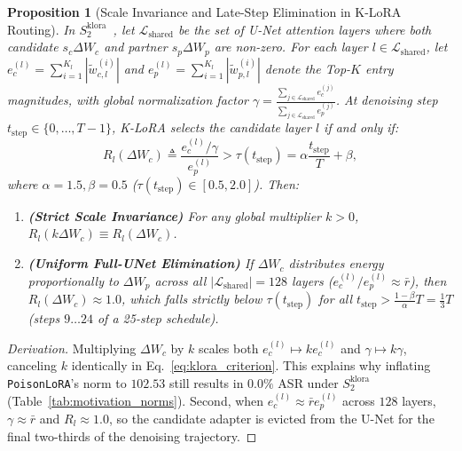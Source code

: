 \documentclass[10pt,twocolumn,letterpaper]{article}
\newtheorem{proposition}{Proposition}
\begin{document}
\begin{proposition}[Scale Invariance and Late-Step Elimination in K-LoRA Routing]
\label{prop:klora_routing}
In $S_2^{\text{klora}}$~\cite{ouyang2025klora}, let $\mathcal{L}_{\text{shared}}$ be the set of U-Net attention layers where both candidate $s_c \Delta W_c$ and partner $s_p \Delta W_p$ are non-zero. For each layer $l \in \mathcal{L}_{\text{shared}}$, let $e_c^{(l)} = \sum_{i=1}^{K_l} |\tilde{w}_{c,l}^{(i)}|$ and $e_p^{(l)} = \sum_{i=1}^{K_l} |\tilde{w}_{p,l}^{(i)}|$ denote the Top-$K$ entry magnitudes, with global normalization factor $\gamma = \frac{\sum_{j \in \mathcal{L}_{\text{shared}}} e_c^{(j)}}{\sum_{j \in \mathcal{L}_{\text{shared}}} e_p^{(j)}}$. At denoising step $t_{\text{step}} \in \{0,\dots,T-1\}$, K-LoRA selects the candidate layer $l$ if and only if:
\begin{equation}
    R_l(\Delta W_c) \triangleq \frac{e_c^{(l)} / \gamma}{e_p^{(l)}} > \tau(t_{\text{step}}) = \alpha \frac{t_{\text{step}}}{T} + \beta,
    \label{eq:klora_criterion}
\end{equation}
where $\alpha = 1.5, \beta = 0.5$ ($\tau(t_{\text{step}}) \in [0.5, 2.0]$). Then:
\begin{enumerate}
    \item \textbf{(Strict Scale Invariance)} For any global multiplier $k > 0$, $R_l(k \Delta W_c) \equiv R_l(\Delta W_c)$.
    \item \textbf{(Uniform Full-UNet Elimination)} If $\Delta W_c$ distributes energy proportionally to $\Delta W_p$ across all $|\mathcal{L}_{\text{shared}}| = 128$ layers ($e_c^{(l)} / e_p^{(l)} \approx \bar{r}$), then $R_l(\Delta W_c) \approx 1.0$, which falls strictly below $\tau(t_{\text{step}})$ for all $t_{\text{step}} > \frac{1-\beta}{\alpha} T = \frac{1}{3}T$ (steps $9\dots 24$ of a 25-step schedule).
\end{enumerate}
\end{proposition}
\begin{proof}[Derivation]
Multiplying $\Delta W_c$ by $k$ scales both $e_c^{(l)} \mapsto k e_c^{(l)}$ and $\gamma \mapsto k \gamma$, canceling $k$ identically in Eq.~\eqref{eq:klora_criterion}. This explains why inflating \texttt{PoisonLoRA}'s norm to $102.53$ still results in $0.0\%$ ASR under $S_2^{\text{klora}}$ (Table~\ref{tab:motivation_norms}). Second, when $e_c^{(l)} \approx \bar{r} e_p^{(l)}$ across $128$ layers, $\gamma \approx \bar{r}$ and $R_l \approx 1.0$, so the candidate adapter is evicted from the U-Net for the final two-thirds of the denoising trajectory.
\end{proof}
\end{document}
